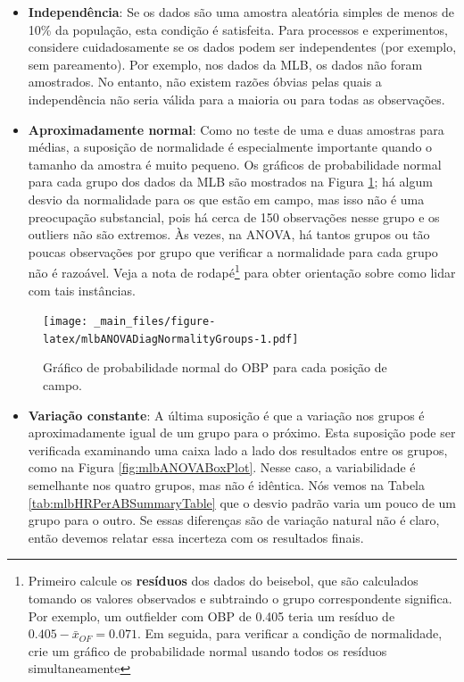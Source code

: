 \documentclass[
]{book}
\providecommand{\tightlist}{%
  \setlength{\itemsep}{0pt}\setlength{\parskip}{0pt}}
\theoremstyle{definition}
\theoremstyle{definition}
\theoremstyle{definition}
\theoremstyle{definition}
\theoremstyle{remark}
\begin{document}
\begin{itemize}
\item
  \textbf{Independência}: Se os dados são uma amostra aleatória simples de menos de 10\% da população, esta condição é satisfeita. Para processos e experimentos, considere cuidadosamente se os dados podem ser independentes (por exemplo, sem pareamento). Por exemplo, nos dados da MLB, os dados não foram amostrados. No entanto, não existem razões óbvias pelas quais a independência não seria válida para a maioria ou para todas as observações.
\item
  \textbf{Aproximadamente normal}: Como no teste de uma e duas amostras para médias, a suposição de normalidade é especialmente importante quando o tamanho da amostra é muito pequeno. Os gráficos de probabilidade normal para cada grupo dos dados da MLB são mostrados na Figura \ref{fig:mlbANOVADiagNormalityGroups}; há algum desvio da normalidade para os que estão em campo, mas isso não é uma preocupação substancial, pois há cerca de 150 observações nesse grupo e os outliers não são extremos. Às vezes, na ANOVA, há tantos grupos ou tão poucas observações por grupo que verificar a normalidade para cada grupo não é razoável. Veja a nota de rodapé\footnote{ Primeiro calcule os \textbf{resíduos} dos dados do beisebol, que são calculados tomando os valores observados e subtraindo o grupo correspondente significa. Por exemplo, um outfielder com OBP de 0.405 teria um resíduo de \(0.405 - \bar{x}_{OF} = 0.071\). Em seguida, para verificar a condição de normalidade, crie um gráfico de probabilidade normal usando todos os resíduos simultaneamente} para obter orientação sobre como lidar com tais instâncias.
\end{itemize}

\begin{figure}
\centering
\texttt{[image: \_main\_files/figure-latex/mlbANOVADiagNormalityGroups-1.pdf]}
\caption{\label{fig:mlbANOVADiagNormalityGroups}Gráfico de probabilidade normal do OBP para cada posição de campo.}
\end{figure}

\begin{itemize}
\tightlist
\item
  \textbf{Variação constante}: A última suposição é que a variação nos grupos é aproximadamente igual de um grupo para o próximo. Esta suposição pode ser verificada examinando uma caixa lado a lado dos resultados entre os grupos, como na Figura \ref{fig:mlbANOVABoxPlot}. Nesse caso, a variabilidade é semelhante nos quatro grupos, mas não é idêntica. Nós vemos na Tabela \ref{tab:mlbHRPerABSummaryTable} que o desvio padrão varia um pouco de um grupo para o outro. Se essas diferenças são de variação natural não é claro, então devemos relatar essa incerteza com os resultados finais.
\end{itemize}
\end{document}
